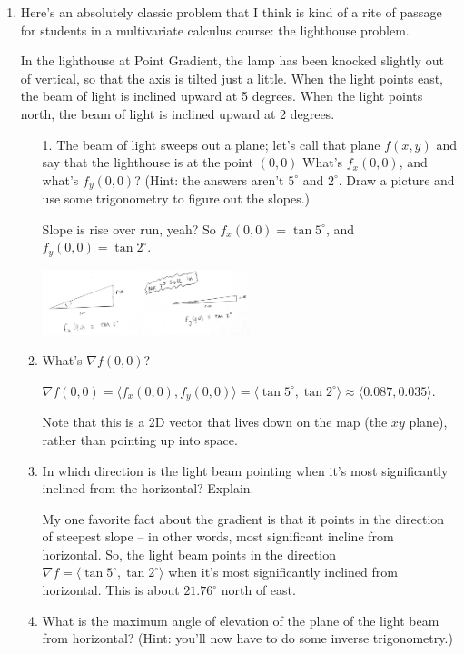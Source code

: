 \documentclass[10pt]{article}
\newcommand\del\nabla
\newenvironment{red}{\color{red}}{\ignorespacesafterend}
\begin{document}
\begin{enumerate}[leftmargin=0pt]
    \item Here's an absolutely classic problem that I think is kind of a rite of passage for students in a multivariate calculus course: the lighthouse problem.
    
    In the lighthouse at Point Gradient, the lamp has been knocked slightly out of vertical, so that the axis is tilted just a little. When the light points east, the beam of light is inclined upward at 5 degrees. When the light points north, the beam of light is inclined upward at 2 degrees.
    
    \begin{enumerate}
        \item[1.] The beam of light sweeps out a plane; let's call that plane $f(x, y)$ and say that the lighthouse is at the point $(0, 0)$ What's $f_x(0, 0)$, and what's $f_y(0, 0)$? (Hint: the answers aren't $5^\circ$ and $2^\circ$. Draw a picture and use some trigonometry to figure out the slopes.)
        
        \begin{red}
        Slope is rise over run, yeah? So $f_x(0, 0) = \tan 5^\circ$, and  $f_y(0, 0) = \tan 2^\circ$.
        
        \begin{center}
        \includegraphics[width=0.5\textwidth]{triangles.jpg}
        \end{center}
        \end{red}
        \item What's $\del f(0, 0)$? 
        
        \begin{red}
        $\del f(0, 0) = \langle f_x(0, 0), f_y(0, 0) \rangle = \langle \tan 5^\circ, \tan 2^\circ\rangle \approx \langle 0.087, 0.035\rangle$. 
        
        Note that this is a 2D vector that lives down on the map (the $xy$ plane), rather than pointing up into space.
        \end{red}
        \item In which direction is the light beam pointing when it's most significantly inclined from the horizontal? Explain. 
        
        \begin{red}
        My one favorite fact about the gradient is that it points in the direction of steepest slope -- in other words, most significant incline from horizontal. So, the light beam points in the direction $\del f = \langle \tan 5^\circ, \tan 2^\circ\rangle$ when it's most significantly inclined from horizontal. This is about $21.76^\circ$ north of east.
        \end{red}
        \item What is the maximum angle of elevation of the plane of the light beam from horizontal? (Hint: you'll now have to do some inverse trigonometry.) 
        

\end{enumerate}
\end{enumerate}
\end{document}
